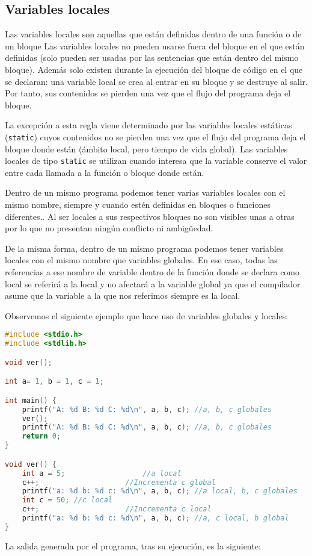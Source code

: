 \subsection{Variables locales}{
Las variables locales son aquellas que están definidas dentro de una función o de un bloque Las variables locales no pueden usarse fuera del bloque en el que están definidas (solo pueden ser usadas por las sentencias que están dentro del mismo bloque). Además solo existen durante la ejecución del bloque de código en el que se declaran: una variable local se crea al entrar en su bloque y se destruye al salir. Por tanto, sus contenidos se pierden una vez que el flujo del programa deja el bloque.

La excepción a esta regla viene determinado por las variables locales estáticas (\texttt{static})  cuyos contenidos no se pierden una vez que el flujo del programa deja el bloque donde están (ámbito local, pero tiempo de vida global). Las variables locales de tipo \texttt{static} se utilizan cuando interesa que la variable conserve el valor entre cada llamada a la función o bloque donde están.

Dentro de un mismo programa podemos tener varias variables locales con el mismo nombre, siempre y cuando estén definidas en bloques o funciones diferentes.. Al ser locales a sus respectivos bloques no son visibles unas a otras por lo que no presentan ningún conflicto ni ambigüedad.

De la misma forma, dentro de un mismo programa podemos tener variables locales con el mismo nombre que variables globales. En ese caso, todas las referencias a ese nombre de variable dentro de la función donde se declara como local se referirá a la local y no afectará a la variable global ya que el compilador asume que la variable a la que nos referimos siempre es la local.

Observemos el siguiente ejemplo que hace uso de variables globales y locales:
\begin{Ejemplo}
\begin{lstlisting}[language=C]
#include <stdio.h>
#include <stdlib.h>

void ver();

int a= 1, b = 1, c = 1;

int main() {
    printf("A: %d B: %d C: %d\n", a, b, c);	//a, b, c globales
    ver();
    printf("A: %d B: %d C: %d\n", a, b, c);	//a, b, c globales
    return 0;
}

void ver() {
    int a = 5;					//a local
    c++;					//Incrementa c global
    printf("a: %d b: %d c: %d\n", a, b, c);	//a local, b, c globales
    int c = 50;	//c local
    c++;					//Incrementa c local
    printf("a: %d b: %d c: %d\n", a, b, c);	//a, c local, b global
}
\end{lstlisting}
La salida generada por el programa, tras su ejecución, es la siguiente:


\end{Ejemplo}}
